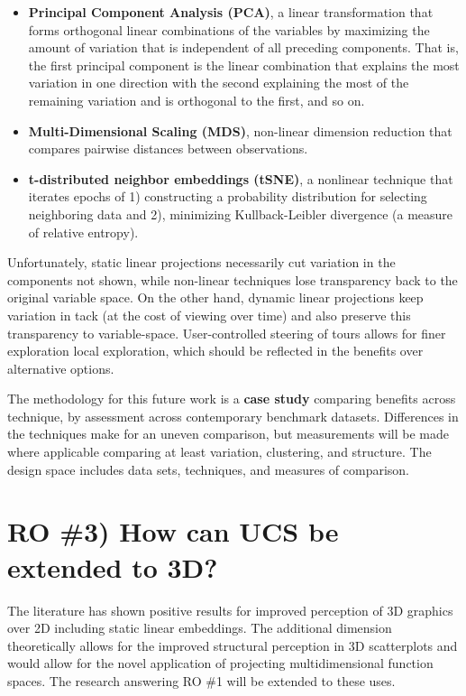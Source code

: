 \documentclass{monashthesis}
\begin{document}
\begin{itemize}
\tightlist
\item
  \textbf{Principal Component Analysis (PCA)}, a linear transformation
  that forms orthogonal linear combinations of the variables by
  maximizing the amount of variation that is independent of all
  preceding components. That is, the first principal component is the
  linear combination that explains the most variation in one direction
  with the second explaining the most of the remaining variation and is
  orthogonal to the first, and so on.
\item
  \textbf{Multi-Dimensional Scaling (MDS)}, non-linear dimension
  reduction that compares pairwise distances between observations.
\item
  \textbf{t-distributed neighbor embeddings (tSNE)}, a nonlinear
  technique that iterates epochs of 1) constructing a probability
  distribution for selecting neighboring data and 2), minimizing
  Kullback-Leibler divergence (a measure of relative entropy).
\end{itemize}

Unfortunately, static linear projections necessarily cut variation in
the components not shown, while non-linear techniques lose transparency
back to the original variable space. On the other hand, dynamic linear
projections keep variation in tack (at the cost of viewing over time)
and also preserve this transparency to variable-space. User-controlled
steering of tours allows for finer exploration local exploration, which
should be reflected in the benefits over alternative options.

The methodology for this future work is a \textbf{case study} comparing
benefits across technique, by assessment across contemporary benchmark
datasets. Differences in the techniques make for an uneven comparison,
but measurements will be made where applicable comparing at least
variation, clustering, and structure. The design space includes data
sets, techniques, and measures of comparison.

\section{RO \#3) How can UCS be extended to
3D?}\label{ro-3-how-can-ucs-be-extended-to-3d}

The literature has shown positive results for improved perception of 3D
graphics over 2D including static linear embeddings. The additional
dimension theoretically allows for the improved structural perception in
3D scatterplots and would allow for the novel application of projecting
multidimensional function spaces. The research answering RO \#1 will be
extended to these uses.
\end{document}
